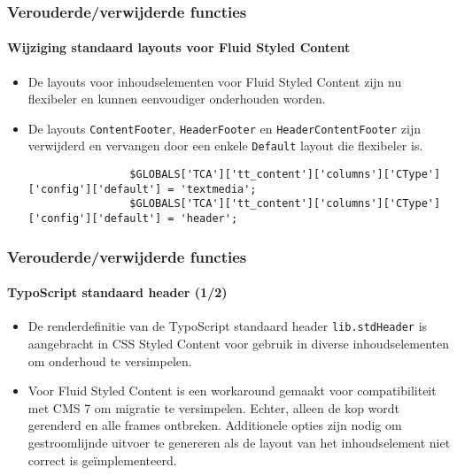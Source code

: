 \begin{frame}[fragile]
	\frametitle{Verouderde/verwijderde functies}
	\framesubtitle{Wijziging standaard layouts voor Fluid Styled Content}

	\lstset{basicstyle=\tiny\ttfamily}

	\begin{itemize}
		\item De layouts voor inhoudselementen voor Fluid Styled Content zijn nu flexibeler en kunnen
			eenvoudiger onderhouden worden.

		\item De layouts \texttt{ContentFooter}, \texttt{HeaderFooter} en \texttt{HeaderContentFooter}
			zijn verwijderd en vervangen door een enkele \texttt{Default} layout die flexibeler is.

			\begin{lstlisting}
				$GLOBALS['TCA']['tt_content']['columns']['CType']['config']['default'] = 'textmedia';
				$GLOBALS['TCA']['tt_content']['columns']['CType']['config']['default'] = 'header';
			\end{lstlisting}

	\end{itemize}

\end{frame}


\begin{frame}[fragile]
	\frametitle{Verouderde/verwijderde functies}
	\framesubtitle{TypoScript standaard header (1/2)}

	\begin{itemize}
		\item De renderdefinitie van de TypoScript standaard header \texttt{lib.stdHeader} is aangebracht in
			CSS Styled Content voor gebruik in diverse inhoudselementen om onderhoud te versimpelen.

		\item Voor Fluid Styled Content is een workaround gemaakt voor compatibiliteit met CMS 7 om migratie
		 	te versimpelen. Echter, alleen de kop wordt gerenderd en alle frames ontbreken. Additionele opties
		 	zijn nodig om gestroomlijnde uitvoer te genereren als de layout van het inhoudselement niet correct
		 	is geïmplementeerd.

	\end{itemize}

\end{frame}

